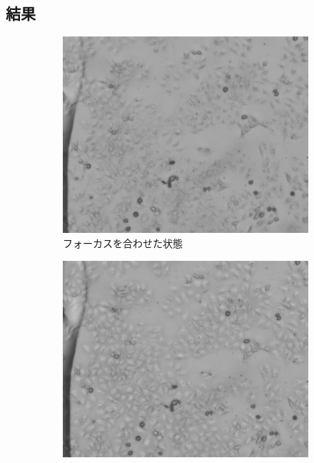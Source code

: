\documentclass[titlepage]{jsarticle}
\begin{document}
\subsection{結果}
\begin{figure}[htbp]
    \centering
    \begin{subfigure}{0.3\columnwidth}
        \includegraphics[width=\columnwidth]{1_1_hela.png}
        \caption{フォーカスを合わせた状態}
        \label{fig:1_1_hela}
    \end{subfigure}
    \begin{subfigure}{0.3\columnwidth}
        \includegraphics[width=\columnwidth]{1_2_hela_back.png}

\end{subfigure}
\end{figure}
\end{document}
